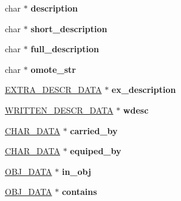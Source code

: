 \begin{DoxyCompactItemize}
\item 
\hypertarget{structobj__data_a1fd194539b4ab06132502f3d385c7384}{char $\ast$ {\bfseries description}}\label{structobj__data_a1fd194539b4ab06132502f3d385c7384}

\item 
\hypertarget{structobj__data_a4d735bde7f2d4d422071b08e78581c14}{char $\ast$ {\bfseries short\-\_\-description}}\label{structobj__data_a4d735bde7f2d4d422071b08e78581c14}

\item 
\hypertarget{structobj__data_ae470e48b110789be6b62a3235ed5e6e3}{char $\ast$ {\bfseries full\-\_\-description}}\label{structobj__data_ae470e48b110789be6b62a3235ed5e6e3}

\item 
\hypertarget{structobj__data_a45db6db8ab608ea8479fe23b6654e180}{char $\ast$ {\bfseries omote\-\_\-str}}\label{structobj__data_a45db6db8ab608ea8479fe23b6654e180}

\item 
\hypertarget{structobj__data_aae768c61a300f56acf4153d39a6d6027}{\hyperlink{structextra__descr__data}{E\-X\-T\-R\-A\-\_\-\-D\-E\-S\-C\-R\-\_\-\-D\-A\-T\-A} $\ast$ {\bfseries ex\-\_\-description}}\label{structobj__data_aae768c61a300f56acf4153d39a6d6027}

\item 
\hypertarget{structobj__data_ae88adcec75a80b279e174f7538f2fbb6}{\hyperlink{structwritten__descr__data}{W\-R\-I\-T\-T\-E\-N\-\_\-\-D\-E\-S\-C\-R\-\_\-\-D\-A\-T\-A} $\ast$ {\bfseries wdesc}}\label{structobj__data_ae88adcec75a80b279e174f7538f2fbb6}

\item 
\hypertarget{structobj__data_a0388d60f29d6a628dbad79bf22b649f0}{\hyperlink{structchar__data}{C\-H\-A\-R\-\_\-\-D\-A\-T\-A} $\ast$ {\bfseries carried\-\_\-by}}\label{structobj__data_a0388d60f29d6a628dbad79bf22b649f0}

\item 
\hypertarget{structobj__data_a80ed7ef3f58646168c9c876596d4abcd}{\hyperlink{structchar__data}{C\-H\-A\-R\-\_\-\-D\-A\-T\-A} $\ast$ {\bfseries equiped\-\_\-by}}\label{structobj__data_a80ed7ef3f58646168c9c876596d4abcd}

\item 
\hypertarget{structobj__data_af59c06024e274536220978e2bc0c591d}{\hyperlink{structobj__data}{O\-B\-J\-\_\-\-D\-A\-T\-A} $\ast$ {\bfseries in\-\_\-obj}}\label{structobj__data_af59c06024e274536220978e2bc0c591d}

\item 
\hypertarget{structobj__data_ab751c8aaa66dcb3c08b364060c13d7b3}{\hyperlink{structobj__data}{O\-B\-J\-\_\-\-D\-A\-T\-A} $\ast$ {\bfseries contains}}\label{structobj__data_ab751c8aaa66dcb3c08b364060c13d7b3}


\end{DoxyCompactItemize}
